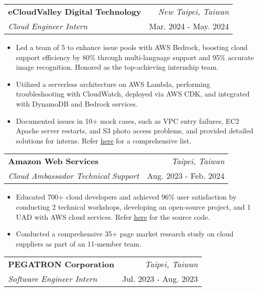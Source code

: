 \documentclass[a4paper, 11pt]{article}
\makeatletter
\newcommand{\resumeSubheading}[4]{
\vspace{0.5mm}\item[]
    \begin{tabular*}{0.98\textwidth}[t]{l@{\extracolsep{\fill}}r}
        \textbf{#1} & \textit{\footnotesize{#4}} \\
        \textit{\footnotesize{#3}} &  \footnotesize{#2}\\
    \end{tabular*}
    \vspace{-2.4mm}
}
\newcommand{\resumeItemListStart}{
    \begin{justify}\begin{itemize}[
        leftmargin=3ex, 
        rightmargin=2ex, 
        noitemsep,
        labelsep=1.2mm,
        itemsep=0.5mm
    ]\small
}
\newcommand{\resumeItemListEnd}{
    \end{itemize}\end{justify}\vspace{-2mm}
}
\makeatother
\begin{document}
    \resumeSubheading
        {eCloudValley Digital Technology}
        {Mar. 2024 - May. 2024}
        {Cloud Engineer Intern}
        {\textcolor{gray}{\footnotesize{\faMapMarker}} New Taipei, Taiwan}

        \vspace{-1.0mm}

        \resumeItemListStart
            \item {Led a team of 5 to enhance issue pools with AWS Bedrock, boosting cloud support efficiency by 80\% through multi-language support and 95\% accurate image recognition. Honored as the top-achieving internship team.}
            \item {Utilized a serverless architecture on AWS Lambda, performing troubleshooting with CloudWatch, deployed via AWS CDK, and integrated with DynamoDB and Bedrock services.}
            \item {Documented issues in 10+ mock cases, such as VPC entry failures, EC2 Apache server restarts, and S3 photo access problems, and provided detailed solutions for interns. Refer \href{https://github.com/1chooo/ecv-training-materials/tree/main/msp/aws_challenge}{\underline{here}} for a comprehensive list.}
        \resumeItemListEnd

    \vspace{-1.0mm}
    
    \resumeSubheading
        {Amazon Web Services}
        {Aug. 2023 - Feb. 2024}
        {Cloud Ambassador Technical Support}
        {\textcolor{gray}{\footnotesize{\faMapMarker}} Taipei, Taiwan}

        \vspace{-1.0mm}

        \resumeItemListStart
            \item Educated 700+ cloud developers and achieved 96\% user satisfaction by conducting 2 technical workshops, developing an open-source project, and 1 UAD with AWS cloud services. Refer \href{https://github.com/aws-educate-tw/aws-line-business-card-workshop}{\underline{here}} for the source code.
            \item {Conducted a comprehensive 35+ page market research study on cloud suppliers as part of an 11-member team.}
        \resumeItemListEnd

    \vspace{-1.0mm}
    
    \resumeSubheading
        {PEGATRON Corporation}
        {Jul. 2023 - Aug. 2023}
        {Software Engineer Intern}
        {\textcolor{gray}{\footnotesize{\faMapMarker}} Taipei, Taiwan}
            
\end{document}
